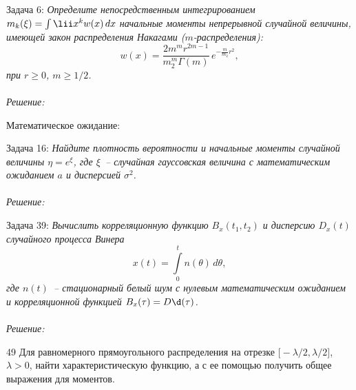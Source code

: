 \documentclass[pscyr]{hedwork}
\newenvironment{task}[2]
  {Задача #1: \emph{#2} \\ \bigskip \\ \emph{Решение:}}{\newpage}
\newenvironment{task*}[2]
  {Задача #1: \emph{#2} \\ \bigskip \\ \emph{Решение:}}{}
\begin{document}
  \maketitle

  \begin{task}{6}{
    Определите непосредственным интегрированием
    \( m_k(\xi) = \int\lii x^k w(x)\,dx \) начальные моменты непрерывной
    случайной величины, имеющей закон распределения Накагами
    (\( m \)-распределения):
    \[
      w(x) = \frac{2m^m r^{2m - 1}}{m_2^m\Gamma(m)}\,e^{-\frac{m}{m_2}r^2},
    \]
    при \( r \ge 0 \), \( m \ge 1 / 2 \).
  }

    Математическое ожидание:
  \end{task}

  \begin{task}{16}{
    Найдите плотность вероятности и начальные моменты случайной величины
    \( \eta = e^\xi \), где \( \xi \)~-- случайная гауссовская величина с
    математическим ожиданием \( a \) и дисперсией \( \sigma^2 \).
  }
    
  \end{task}
  
  \begin{task}{39}{
    Вычислить корреляционную функцию \( B_x(t_1, t_2) \) и дисперсию
    \( D_x(t) \) случайного процесса Винера
    \[
      x(t) = \int\limits_0^t n(\theta)\,d\theta,
    \]
    где \( n(t) \)~-- стационарный белый шум с нулевым математическим ожиданием
    и корреляционной функцией \( B_x(\tau) = D\d(\tau) \).
  }
  
  \end{task}
  
  \begin{task*}{49}{
    Для равномерного прямоугольного распределения на отрезке
    \( \bigl[-\lambda / 2, \lambda / 2 \big] \), \( \lambda > 0 \), найти
    характеристическую функцию, а с ее помощью получить общее выражения для
    моментов.
  }
  
  \end{task*}
\end{document}
